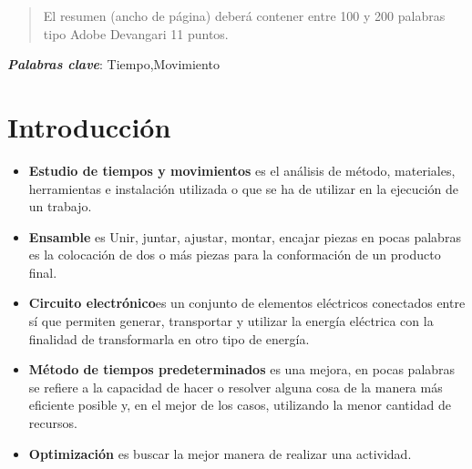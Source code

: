     \maketitle
    \thispagestyle{fancy}
    
    
    
    \begin{abstract}
    \noindent 
    El resumen (ancho de página) deberá contener entre 100 y 200 palabras tipo Adobe Devangari 11 puntos.
    
    \end{abstract}
    \textbf{\textit{Palabras clave}}:
    Tiempo,Movimiento
          
    
    \section{Introducción}
    \begin{itemize}
    \item \textbf{{Estudio de tiempos y movimientos}} es el análisis de método, materiales, herramientas e instalación utilizada o que se ha de utilizar en la ejecución de un trabajo. \cite{RAE}
    \item \textbf{Ensamble} es Unir, juntar, ajustar, montar, encajar piezas en pocas palabras es la colocación de dos o más piezas para la conformación de un producto final. \cite{RAE}
    \item \textbf {Circuito electrónico}es un conjunto de elementos eléctricos conectados entre sí que permiten generar, transportar y utilizar la energía eléctrica con la finalidad de transformarla en otro tipo de energía. \cite{RAE}
    \item \textbf{Método de tiempos predeterminados} es una mejora, en pocas palabras se refiere a la capacidad de hacer o resolver alguna cosa de la manera más eficiente posible y, en el mejor de los casos, utilizando la menor cantidad de recursos. \cite{RAE}
    \item \textbf{Optimización} es buscar la mejor manera de realizar una actividad. \cite{RAE}
    \end{itemize}
    
